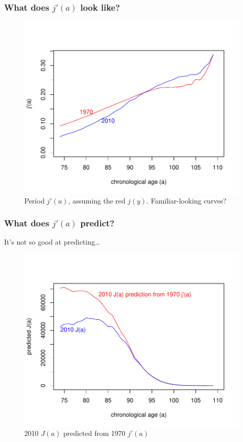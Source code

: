 \documentclass[20pt]{beamer}
\begin{document}
\begin{frame}
\frametitle{What does $j'(a)$ look like?}
\begin{figure}[b]
    \centering
    \caption{Period $j'(a)$, assuming the red $j(y)$. Familiar-looking
    curves?\footnotemark}
    \vspace{-3em}
    \includegraphics[scale=1.2]{Figures/jprimeaExample.pdf}
\end{figure} 
\end{frame}

\begin{frame}
\frametitle{What does $j'(a)$ predict?}
It's not so good at predicting\ldots
\begin{figure}[b]
    \centering
    \caption{2010 $J(a)$ predicted from 1970 $j'(a)$~~~~\footnotemark}
    \vspace{-3em}
    \includegraphics[scale=1.2]{Figures/jprimeaBadExample.pdf}
\end{figure} 
\end{frame}
\end{document}
